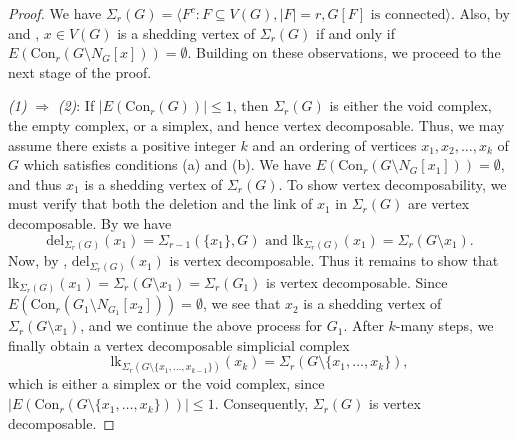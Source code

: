 \documentclass[12pt,reqno]{amsart}
\theoremstyle{definition}
\newcommand{\lk}{{\mathrm{lk}}}
\newcommand{\del}{{\mathrm{del}}}
\newcommand{\Con}{{\mathrm{Con}}}
\def\del{\mathrm{del}}
\def\l{\langle}
\def\r{\rangle}
\begin{document}
	\begin{proof}
		We have $\Sigma_r(G)=\l F^c\colon F\subseteq V(G), |F|=r, G[F]\text{ is connected}\r$. Also, by  and , $x\in V(G)$ is a shedding vertex of $\Sigma_r(G)$ if and only if $E(\Con_r(G \setminus N_G[x])) = \emptyset$. Building on these observations, we proceed to the next stage of the proof.
		
		\medskip
		\noindent
		\emph{(1)} $\Rightarrow$ \emph{(2)}: If $|E(\Con_r(G))|\le 1$, then $\Sigma_r(G)$ is either the void complex, the empty complex, or a simplex, and hence vertex decomposable. Thus, we may assume there exists a positive integer $k$ and an ordering of vertices $x_1,x_2,\ldots,x_k$ of $G$ which satisfies conditions (a) and (b). We have $E(\Con_r(G \setminus N_G[x_1])) = \emptyset$, and thus $x_1$ is a shedding vertex of $\Sigma_r(G)$. To show vertex decomposability, we must verify that both the deletion and the link of $x_1$ in $\Sigma_r(G)$ are vertex decomposable. By  we have 
		\[
		\del_{\Sigma_r(G)}(x_1) = \Sigma_{r-1}(\{x_1\},G)\text{  and  }\lk_{\Sigma_r(G)}(x_1)=\Sigma_r(G \setminus x_1).
		\] 
		Now, by , $\del_{\Sigma_r(G)}(x_1)$ is vertex decomposable. Thus it remains to show that $\lk_{\Sigma_r(G)}(x_1)=\Sigma_r(G \setminus x_1)=\Sigma_r(G_1)$ is vertex decomposable. Since $E(\Con_r(G_1\setminus N_{G_1}[x_2]))=\emptyset$, we see that $x_2$ is a shedding vertex of $\Sigma_r(G \setminus x_1)$, and we continue the above process for $G_1$. After $k$-many steps, we finally obtain a vertex decomposable simplicial complex \[
        \lk_{\Sigma_r(G \setminus \{x_1, \ldots, x_{k-1}\})}(x_k) = \Sigma_r(G \setminus \{x_1, \ldots, x_k\}),
        \]
        which is either a simplex or the void complex, since $|E(\Con_r(G\setminus\{x_1,\ldots,x_k\}))| \le 1$. Consequently, $\Sigma_r(G)$ is vertex decomposable. 
		

\end{proof}
\end{document}
